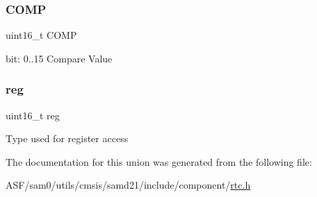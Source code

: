 \subsubsection{\texorpdfstring{COMP}{COMP}}
{\footnotesize\ttfamily uint16\+\_\+t C\+O\+MP}

bit\+: 0..15 Compare Value \mbox{\label{union_r_t_c___m_o_d_e1___c_o_m_p___type_a11760f5020019f4aa8cb02e694f7cc44}} 
\subsubsection{\texorpdfstring{reg}{reg}}
{\footnotesize\ttfamily uint16\+\_\+t reg}

Type used for register access 

The documentation for this union was generated from the following file\+:\begin{DoxyCompactItemize}
\item 
A\+S\+F/sam0/utils/cmsis/samd21/include/component/\mbox{\hyperlink{component_2rtc_8h}{rtc.\+h}}\end{DoxyCompactItemize}
